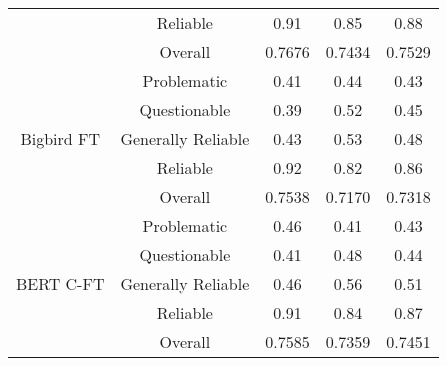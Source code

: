 \begin{table}[htbp]
\begin{tabular}{| c | c | c | c | c |}
                                                           & Reliable           & 0.91               & 0.85            & 0.88            \\\cline{2-5}
                                                           & Overall            & 0.7676             & 0.7434          & 0.7529          \\
        \hline
        \multirow{5}{*}{Bigbird FT}                        & Problematic        & 0.41               & 0.44            & 0.43            \\
                                                           & Questionable       & 0.39               & 0.52            & 0.45            \\
                                                           & Generally Reliable & 0.43               & 0.53            & 0.48            \\
                                                           & Reliable           & 0.92               & 0.82            & 0.86            \\\cline{2-5}
                                                           & Overall            & 0.7538             & 0.7170          & 0.7318          \\
        \hline
        \multirow{5}{*}{BERT C-FT}                         & Problematic        & 0.46               & 0.41            & 0.43            \\
                                                           & Questionable       & 0.41               & 0.48            & 0.44            \\
                                                           & Generally Reliable & 0.46               & 0.56            & 0.51            \\
                                                           & Reliable           & 0.91               & 0.84            & 0.87            \\\cline{2-5}
                                                           & Overall            & 0.7585             & 0.7359          & 0.7451          \\
        \hline

\end{tabular}
\end{table}

